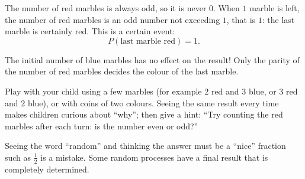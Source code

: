 {
The number of red marbles is always odd, so it is never $0$. When $1$ marble is left, the number of red marbles is an odd number not exceeding
$1$, that is $1$: the last marble is certainly red. This is a certain event:
\[P(\text{last marble red})=1.\]
\begin{tipbox}The initial number of blue marbles has no effect on the result! Only the parity of the number of red marbles decides the colour
of the last marble.\end{tipbox}
\begin{parentbox}Play with your child using a few marbles (for example $2$ red and $3$ blue, or $3$ red and $2$ blue), or with coins of two
colours. Seeing the same result every time makes children curious about ``why''; then give a hint: ``Try counting the red marbles after each
turn: is the number even or odd?''\end{parentbox}
\begin{warnbox}Seeing the word ``random'' and thinking the answer must be a ``nice'' fraction such as $\frac12$ is a mistake. Some random
processes have a final result that is completely determined.\end{warnbox}
}
